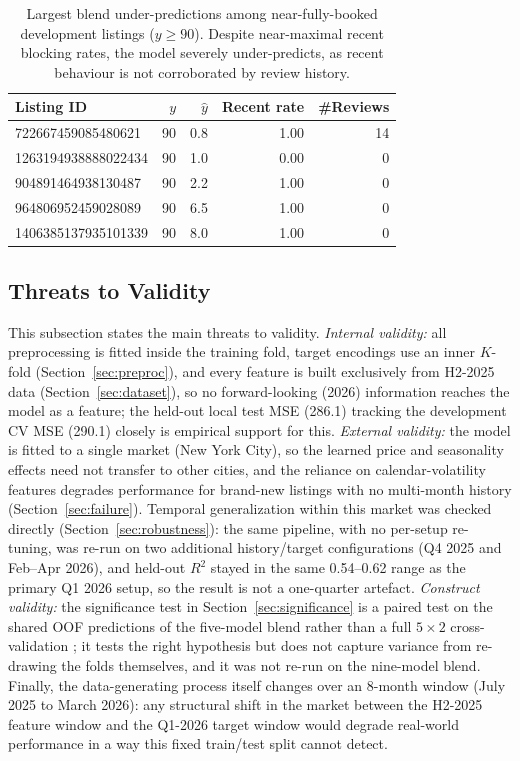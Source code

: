 \documentclass[journal]{IEEEtran}
\begin{document}
\begin{table}[!t]
\caption{Largest blend under-predictions among near-fully-booked development
listings ($y\ge90$). Despite near-maximal recent blocking rates, the model
severely under-predicts, as recent behaviour is not corroborated by review
history.}
\label{tab:failure}
\centering
\small
\begin{tabular}{lrrrr}
\toprule
Listing ID & $y$ & $\hat y$ & Recent rate & \#Reviews \\
\midrule
722667459085480621  & 90 & 0.8 & 1.00 & 14 \\
1263194938888022434 & 90 & 1.0 & 0.00 & 0 \\
904891464938130487  & 90 & 2.2 & 1.00 & 0 \\
964806952459028089  & 90 & 6.5 & 1.00 & 0 \\
1406385137935101339 & 90 & 8.0 & 1.00 & 0 \\
\bottomrule
\end{tabular}
\end{table}

\subsection{Threats to Validity}
\label{sec:threats}
This subsection states the main threats to validity. \emph{Internal validity:}
all preprocessing is fitted inside the training fold, target encodings use an
inner $K$-fold (Section~\ref{sec:preproc}), and every feature is built
exclusively from H2-2025 data (Section~\ref{sec:dataset}), so no forward-looking
(2026) information reaches the model as a feature; the held-out local test MSE
(286.1) tracking the development CV MSE (290.1) closely is empirical support
for this. \emph{External validity:} the model is fitted to a single market
(New York City), so the learned price and seasonality effects need not
transfer to other cities, and the reliance on calendar-volatility features
degrades performance for brand-new listings with no multi-month history
(Section~\ref{sec:failure}). Temporal generalization within this market was
checked directly (Section~\ref{sec:robustness}): the same pipeline, with no
per-setup re-tuning, was re-run on two additional history/target
configurations (Q4 2025 and Feb--Apr 2026), and held-out $R^2$ stayed in the
same 0.54--0.62 range as the primary Q1 2026 setup, so the result is not a
one-quarter artefact.
\emph{Construct validity:} the significance test in
Section~\ref{sec:significance} is a paired test on the shared OOF predictions
of the five-model blend rather than a full $5\times2$ cross-validation
\cite{dietterich1998}; it tests the right hypothesis but does not capture
variance from re-drawing the folds themselves, and it was not re-run on the
nine-model blend. Finally, the data-generating process itself changes over an
8-month window (July 2025 to March 2026): any structural shift in the market
between the H2-2025 feature window and the Q1-2026 target window would degrade
real-world performance in a way this fixed train/test split cannot detect.
\end{document}
